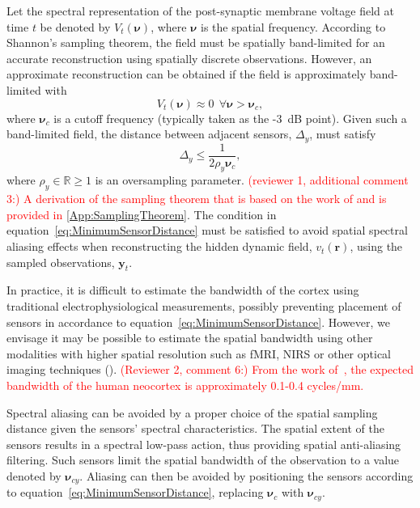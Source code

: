 \documentclass[review,authoryear,3p]{elsarticle}
\newcommand{\dean}[1]{\textcolor{red}{#1}}
\begin{document}
Let the spectral representation of the post-synaptic membrane voltage field at time $t$ be denoted by $V_t(\boldsymbol{\nu})$, where $\boldsymbol\nu$ is the spatial frequency. According to Shannon's sampling theorem, the field must be spatially band-limited for an accurate reconstruction using spatially discrete observations. However, an approximate reconstruction can be obtained if the field is approximately band-limited with 
\begin{equation}
	V_t(\boldsymbol{\nu}) \approx 0 ~ \ \forall \boldsymbol{\nu} > \boldsymbol{\nu}_c,
\end{equation}
where $\boldsymbol{\nu}_c$ is a cutoff frequency (typically taken as the -3~dB point). Given such a band-limited field, the distance between adjacent sensors, $\Delta_y$, must satisfy 
\begin{equation}
	\label{eq:MinimumSensorDistance} \Delta_y \leq \frac{1}{2\rho_y\boldsymbol{\nu}_{c}}, 
\end{equation}
where $\rho_y \in \mathbb{R} \ge 1$ is an oversampling parameter. \dean{(reviewer 1, additional comment 3:) A derivation of the sampling theorem that is based on the work of \citet{Sanner1992} and \citet{Scerri2009} is provided in \ref{App:SamplingTheorem}}. The condition in equation~\ref{eq:MinimumSensorDistance} must be satisfied to avoid spatial spectral aliasing effects when reconstructing the hidden dynamic field, $v_t(\mathbf{r})$, using the sampled observations, $\mathbf{y}_t$.

In practice, it is difficult to estimate the bandwidth of the cortex using traditional electrophysiological measurements, possibly preventing placement of sensors in accordance to equation~\ref{eq:MinimumSensorDistance}. However, we envisage it may be possible to estimate the spatial bandwidth using other modalities with higher spatial resolution such as fMRI, NIRS or other optical imaging techniques (\cite{Issa2000}). \dean{(Reviewer 2, comment 6:) From the work of~\citet{Freeman2000}, the expected bandwidth of the human neocortex is approximately 0.1-0.4 cycles/mm.}

Spectral aliasing can be avoided by a proper choice of the spatial sampling distance given the sensors' spectral characteristics. The spatial extent of the sensors results in a spectral low-pass action, thus providing spatial anti-aliasing filtering. Such sensors limit the spatial bandwidth of the observation to a value denoted by $\boldsymbol{\nu}_{cy}$. Aliasing can then be avoided by positioning the sensors according to equation~\ref{eq:MinimumSensorDistance}, replacing $\boldsymbol{\nu}_c$ with $\boldsymbol{\nu}_{cy}$.
\end{document}
